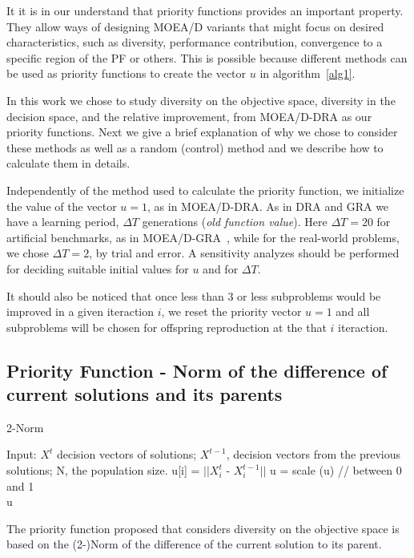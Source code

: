 It it is  in our understand that priority functions provides an important property. They allow ways of designing MOEA/D variants that might focus on desired characteristics, such as diversity, performance contribution, convergence to a specific region of the PF or others. This is possible because different methods can be used as priority functions to create the vector $u$ in algorithm~\ref{alg1}. 

In this work we chose to study diversity on the objective space, diversity in the decision space, and the relative improvement, from MOEA/D-DRA as our priority functions. Next we give a brief explanation of why we chose to consider these methods as well as a random (control) method and we describe how to calculate them in details.

Independently of the method used to calculate the priority function, we initialize the value of the vector $u=1$, as in MOEA/D-DRA. As in DRA and GRA we have a learning period, $\Delta T$ generations (\textit{old function value}). Here $\Delta T=20$ for artificial benchmarks, as in MOEA/D-GRA~\cite{zhou2016all}, while for the real-world problems, we chose $\Delta T=2$, by trial and error. A sensitivity analyzes should be performed for deciding suitable initial values for $u$ and for $\Delta T$.

 It should also be noticed that once less than $3$ or less subproblems would be improved in a given iteraction $i$, we reset the priority vector $u = 1$  and all subproblems will be chosen for offspring reproduction at the that $i$ iteraction.

\subsection{Priority Function - Norm of the difference of current solutions and its parents} 

\begin{algorithm}[t]
	\caption{2-Norm}\label{alg3}
	\begin{algorithmic}[1]
		
		\State Input: $X^{t}$ decision vectors of solutions; $X^{t-1}$, decision vectors from the previous solutions; N, the population size.
			\State u[i] = $||X^{t}_i$ - $X^{t-1}_i||$
		\EndFor
		\State u = scale (u) // between 0 and 1\\
	\Return u
	\end{algorithmic}
\end{algorithm}

The priority function proposed that considers diversity on the objective space is based on the (2-)Norm of the difference of the current solution to its parent.

